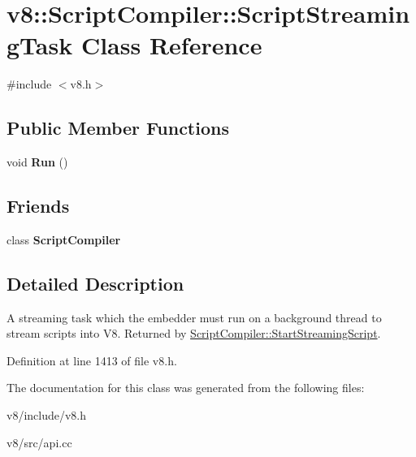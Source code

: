 \hypertarget{classv8_1_1ScriptCompiler_1_1ScriptStreamingTask}{}\section{v8\+:\+:Script\+Compiler\+:\+:Script\+Streaming\+Task Class Reference}
\label{classv8_1_1ScriptCompiler_1_1ScriptStreamingTask}


{\ttfamily \#include $<$v8.\+h$>$}

\subsection*{Public Member Functions}
\begin{DoxyCompactItemize}
\item 
\mbox{\label{classv8_1_1ScriptCompiler_1_1ScriptStreamingTask_ac4900e34a2045112d3ed10db8228165b}} 
void {\bfseries Run} ()
\end{DoxyCompactItemize}
\subsection*{Friends}
\begin{DoxyCompactItemize}
\item 
\mbox{\label{classv8_1_1ScriptCompiler_1_1ScriptStreamingTask_a1cb50af99960b4c11eaee7347e034f51}} 
class {\bfseries Script\+Compiler}
\end{DoxyCompactItemize}


\subsection{Detailed Description}
A streaming task which the embedder must run on a background thread to stream scripts into V8. Returned by \mbox{\hyperlink{classv8_1_1ScriptCompiler_a556e64fe39f5bcafd9f4c04957776f60}{Script\+Compiler\+::\+Start\+Streaming\+Script}}. 

Definition at line 1413 of file v8.\+h.



The documentation for this class was generated from the following files\+:\begin{DoxyCompactItemize}
\item 
v8/include/v8.\+h\item 
v8/src/api.\+cc\end{DoxyCompactItemize}
